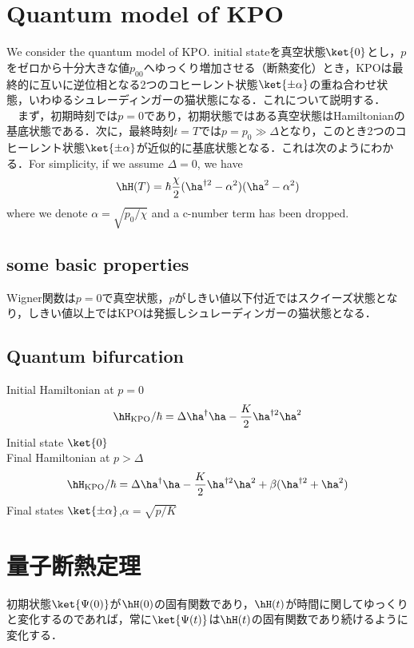 \section{Quantum model of KPO}
We consider the quantum model of KPO. initial stateを真空状態$\ket{0}$とし，$p$をゼロから十分大きな値$p_00$へゆっくり増加させる（断熱変化）とき，KPOは最終的に互いに逆位相となる2つのコヒーレント状態$\ket{\pm\alpha}$の重ね合わせ状態，いわゆるシュレーディンガーの猫状態になる．これについて説明する．\\
　まず，初期時刻では$p=0$であり，初期状態ではある真空状態はHamiltonianの基底状態である．次に，最終時刻$t=T$では$p=p_0\gg\Delta$となり，このとき2つのコヒーレント状態$\ket{\pm\alpha}$が近似的に基底状態となる．これは次のようにわかる．For simplicity, if we assume $\Delta = 0$, we have
\begin{equation}
    \hH(T) = \hbar\frac{\chi}{2}(\ha^{\dagger2} - \alpha^2)(\ha^2 - \alpha^2)
\end{equation}
where we denote $\alpha = \sqrt{p_0/\chi}$ and a c-number term has been dropped.


\subsection{some basic properties}
Wigner関数は$p=0$で真空状態，$p$がしきい値以下付近ではスクイーズ状態となり，しきい値以上ではKPOは発振しシュレーディンガーの猫状態となる．
\subsection{Quantum bifurcation}
Initial Hamiltonian at $p=0$\\
\begin{equation}
    \hH_{\rm{KPO}}/\hbar
    =\Delta\ha^\dag\ha-\frac{K}{2}\ha^{\dag2}\ha^2
\end{equation}
Initial state $\ket{0}$\\

Final Hamiltonian at $p>\Delta$
\begin{equation}
    \hH_{\rm{KPO}}/\hbar
    =\Delta\ha^\dag\ha-\frac{K}{2}\ha^{\dag2}\ha^2+\beta(\ha^{\dagger2}+\ha^2)
\end{equation}
Final states $\ket{\pm\alpha}$,$\alpha=\sqrt{p/K}$

\section{量子断熱定理}
初期状態$\ket{\Psi(0)}$が$\hH(0)$の固有関数であり，$\hH(t)$が時間に関してゆっくりと変化するのであれば，常に$\ket{\Psi(t)}$は$\hH(t)$の固有関数であり続けるように変化する．


